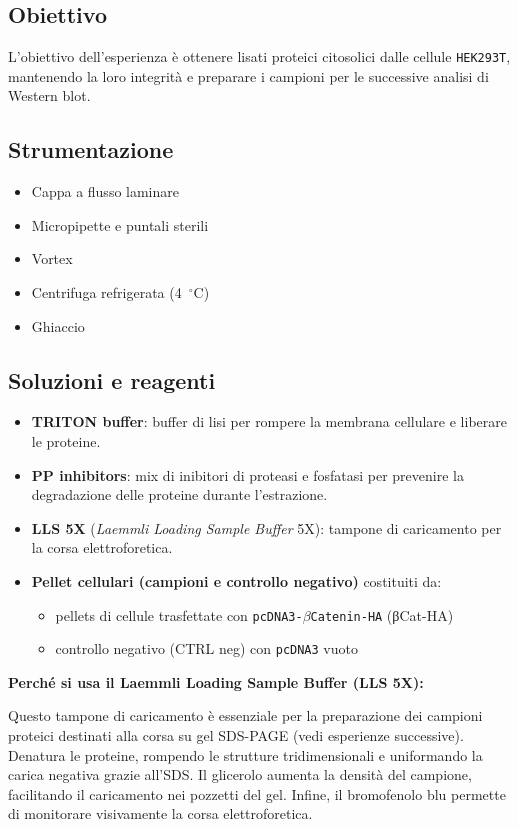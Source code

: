 \subsection{Obiettivo}
L’obiettivo dell’esperienza è ottenere lisati proteici citosolici dalle cellule \texttt{HEK293T}, mantenendo la loro integrità e preparare i campioni per le successive analisi di Western blot.

\subsection{Strumentazione}
\begin{itemize}
	\item Cappa a flusso laminare
	\item Micropipette e puntali sterili
	\item Vortex
	\item Centrifuga refrigerata (4~$^\circ$C)
	\item Ghiaccio
\end{itemize}

\subsection{Soluzioni e reagenti}\footnotesize{
  \begin{itemize}
	\item \textbf{TRITON buffer}: buffer di lisi per rompere la membrana cellulare e liberare le proteine.
	\item \textbf{PP inhibitors}: mix di inibitori di proteasi e fosfatasi per prevenire la degradazione delle proteine durante l’estrazione.
	\item \textbf{LLS 5X} (\textit{Laemmli Loading Sample Buffer} 5X): tampone di caricamento per la corsa elettroforetica.
	\item \textbf{Pellet cellulari (campioni e controllo negativo)} costituiti da:
	\begin{itemize}\footnotesize
		\item pellets di cellule trasfettate con \texttt{pcDNA3-$\beta$Catenin-HA} (βCat-HA)
		\item controllo negativo (CTRL neg) con \texttt{pcDNA3} vuoto
	\end{itemize}

\end{itemize}
}


\begin{percheBox}
	\textbf{Perché si usa il Laemmli Loading Sample Buffer (LLS 5X):}

	Questo tampone di caricamento è essenziale per la preparazione dei campioni proteici destinati alla corsa su gel SDS-PAGE (vedi esperienze successive).
	Denatura le proteine, rompendo le strutture tridimensionali e uniformando la carica negativa grazie all’SDS.
	Il glicerolo aumenta la densità del campione, facilitando il caricamento nei pozzetti del gel.
	Infine, il bromofenolo blu permette di monitorare visivamente la corsa elettroforetica.
\end{percheBox}
\newpage

